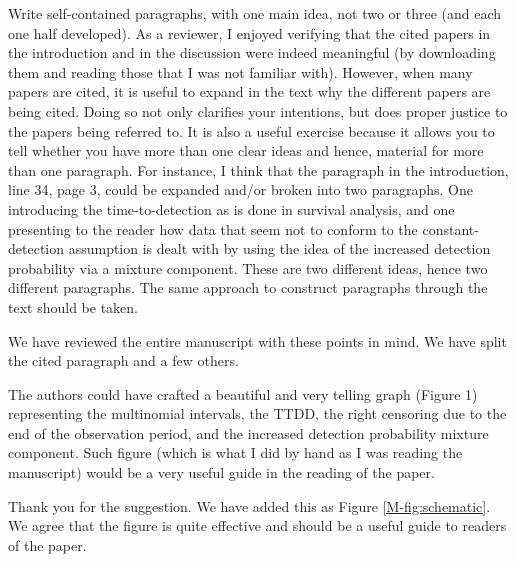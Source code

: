 \documentclass[12pt]{article}
\renewenvironment{quote}  %
              {\list{}{\rightmargin\leftmargin}\normalfont%
               \item\relax}
              {\endlist}
\begin{document}
Write self-contained paragraphs, with one main idea, not two or three (and each one half developed). As a reviewer, I enjoyed verifying that the cited papers in the introduction and in the discussion were indeed meaningful (by downloading them and reading those that I was not familiar with). However, when many papers are cited, it is useful to expand in the text why the different papers are being cited.  Doing so not only clarifies your intentions, but does proper justice to the papers being referred to. It is also a useful exercise because it allows you to tell whether you have more than one clear ideas and hence, material for more than one paragraph.  For instance, I think that the paragraph in the introduction, line 34, page 3, could be expanded and/or broken into two paragraphs.  One introducing the time-to-detection as is done in survival analysis, and one presenting to the reader how data that seem not to conform to the constant-detection assumption is dealt with by
using the idea of the increased detection probability via a mixture component. These are two different ideas, hence two different paragraphs. The same approach to construct paragraphs through the text should be taken.
\begin{quote}
We have reviewed the entire manuscript with these points in mind.
We have split the cited paragraph and a few others.
\end{quote}

The authors could have crafted a beautiful and very telling graph (Figure 1) representing the multinomial intervals, the TTDD, the right censoring due to the end of the observation period, and the increased detection probability mixture component. Such figure (which is what I did by hand as I was reading the manuscript) would be a very useful guide in the reading of the paper.
\begin{quote}
Thank you for the suggestion.
We have added this as Figure \ref{M-fig:schematic}.
We agree that the figure is quite effective and should be a useful guide to readers of the paper.
\end{quote}
\end{document}
